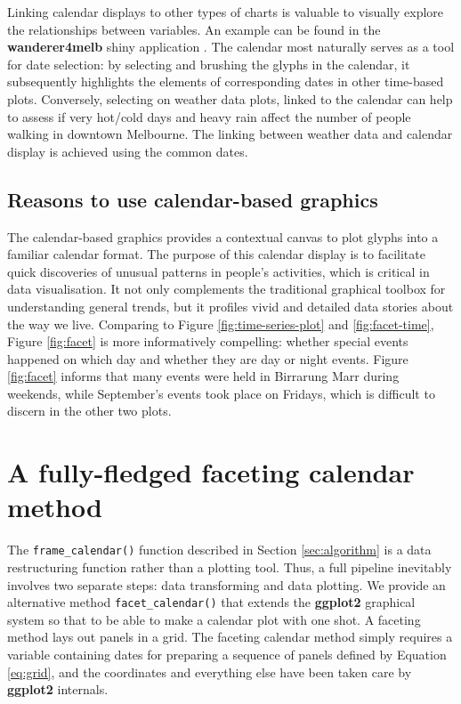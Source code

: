 \documentclass[12pt]{article}
\begin{document}
Linking calendar displays to other types of charts is valuable to visually explore the relationships between variables. An example can be found in the \textbf{wanderer4melb} shiny application \citep{R-wanderer4melb}. The calendar most naturally serves as a tool for date selection: by selecting and brushing the glyphs in the calendar, it subsequently highlights the elements of corresponding dates in other time-based plots. Conversely, selecting on weather data plots, linked to the calendar can help to assess if very hot/cold days and heavy rain affect the number of people walking in downtown Melbourne. The linking between weather data and calendar display is achieved using the common dates.

\hypertarget{reasons-to-use-calendar-based-graphics}{%
\subsection{Reasons to use calendar-based graphics}\label{reasons-to-use-calendar-based-graphics}}

The calendar-based graphics provides a contextual canvas to plot glyphs into a familiar calendar format. The purpose of this calendar display is to facilitate quick discoveries of unusual patterns in people's activities, which is critical in data visualisation. It not only complements the traditional graphical toolbox for understanding general trends, but it profiles vivid and detailed data stories about the way we live. Comparing to Figure \ref{fig:time-series-plot} and \ref{fig:facet-time}, Figure \ref{fig:facet} is more informatively compelling: whether special events happened on which day and whether they are day or night events. Figure \ref{fig:facet} informs that many events were held in Birrarung Marr during weekends, while September's events took place on Fridays, which is difficult to discern in the other two plots.

\hypertarget{sec:facet-calendar}{%
\section{A fully-fledged faceting calendar method}\label{sec:facet-calendar}}

The \texttt{frame\_calendar()} function described in Section \ref{sec:algorithm} is a data restructuring function rather than a plotting tool. Thus, a full pipeline inevitably involves two separate steps: data transforming and data plotting. We provide an alternative method \texttt{facet\_calendar()} that extends the \textbf{ggplot2} graphical system so that to be able to make a calendar plot with one shot. A faceting method lays out panels in a grid. The faceting calendar method simply requires a variable containing dates for preparing a sequence of panels defined by Equation \eqref{eq:grid}, and the coordinates and everything else have been taken care by \textbf{ggplot2} internals.
\end{document}
